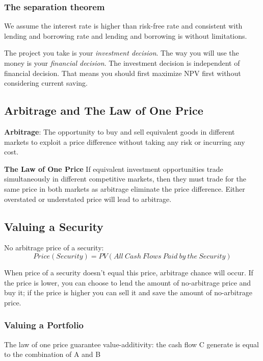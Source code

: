 \documentclass[10pt, a4paper]{article}
\begin{document}
            \subsubsection{The separation theorem }
                We assume the interest rate is higher than risk-free rate and consistent with lending and borrowing rate and lending and borrowing is without limitations. 

                The project you take is your \emph{investment decision}. The way you will use the money is your \emph{financial decision}. The investment decision is independent of financial decision. That means you should first maximize NPV first without considering current saving. 

        \subsection{Arbitrage and The Law of One Price}
            \textbf{Arbitrage}: The opportunity to buy and sell equivalent goods in different markets to exploit a price difference without taking any risk or incurring any cost. 

            \textbf{The Law of One Price}
                If equivalent investment opportunities trade simultaneously in different competitive markets, then they must trade for the same price in both markets as arbitrage eliminate the price difference.
                Either overstated or understated price will lead to arbitrage.
                
            \subsection{Valuing a Security}
                No arbitrage price of a security: 
                $$Price(Security) = PV(All\ Cash\ Flows\ Paid\ by\ the\ Security)$$

                When price of a security doesn't equal this price, arbitrage chance will occur. If the price is lower, you can choose to lend the amount of no-arbitrage price and buy it; if the price is higher you can sell it and save the amount of  no-arbitrage price. 

            \subsubsection{Valuing a Portfolio}
                The law of one price guarantee value-additivity: the cash flow C generate is equal to the combination of A and B
\end{document}
